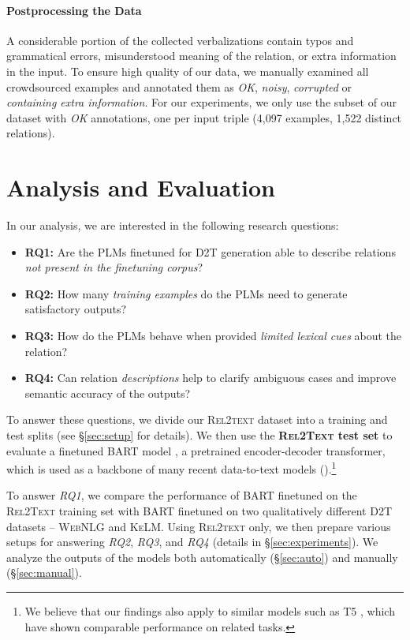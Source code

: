 \paragraph{Postprocessing the Data}
A considerable portion of the collected verbalizations contain typos and grammatical errors, misunderstood meaning of the relation, or extra information in the input. To ensure high quality of our data, we manually examined all crowdsourced examples and annotated them as \textit{OK}, \textit{noisy}, \textit{corrupted} or \textit{containing extra information}. For our experiments, we only use the subset of our dataset with \textit{OK} annotations, one per input triple (4,097 examples, 1,522 distinct relations).


\section{Analysis and Evaluation}
In our analysis, we are interested in the following research questions:
\begin{itemize}
    \item \textbf{RQ1:} Are the PLMs finetuned for D2T generation able to describe relations \textit{not present in the finetuning corpus}?
    \item \textbf{RQ2:} How many \textit{training examples} do the PLMs need to generate satisfactory outputs?
    \item \textbf{RQ3:} How do the PLMs behave when provided \textit{limited lexical cues} about the relation?
    \item \textbf{RQ4:} Can relation \textit{descriptions} help to clarify ambiguous cases and improve semantic accuracy of the outputs?
\end{itemize}

To answer these questions, we divide our \textsc{Rel2text} dataset into a training and test splits (see §\ref{sec:setup} for details). We then use the \textbf{\textsc{Rel2Text} test set} to evaluate a finetuned BART model \cite{lewis2020bart}, a pretrained encoder-decoder transformer, which is used as a backbone of many recent data-to-text models (\citealp{ke2021jointgt,xing2021structure,ribeiro2020investigating,liu2021kg}).\footnote{We believe that our findings also apply to similar models such as T5 \cite{raffel2020exploring}, which have shown comparable performance on related tasks.}

To answer \textit{RQ1}, we compare the performance of BART finetuned on the \textsc{Rel2Text} training set with BART finetuned on two qualitatively different D2T datasets -- \textsc{WebNLG} and \textsc{KeLM}. Using \textsc{Rel2text} only, we then prepare various setups for answering \textit{RQ2}, \textit{RQ3}, and \textit{RQ4} (details in §\ref{sec:experiments}). We analyze the outputs of the models  both automatically (§\ref{sec:auto}) and manually (§\ref{sec:manual}).



